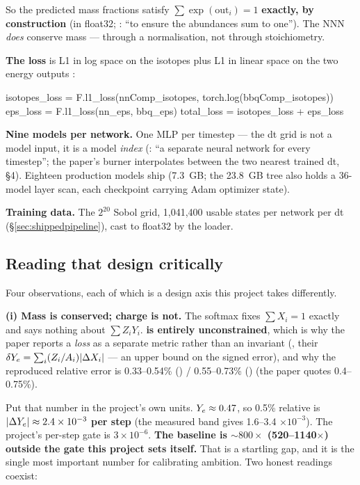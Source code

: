 So the predicted mass fractions satisfy $\sum\exp(\mathrm{out}_i) = 1$
\textbf{exactly, by construction} (in float32; \citealt[\S 2.3]{grichener2025}:
``to ensure the abundances sum to one''). The NNN \emph{does} conserve mass ---
through a normalisation, not through stoichiometry.

\textbf{The loss} is L1 in log space on the isotopes plus L1 in linear space on
the two energy outputs \citep[\S 2.4]{grichener2025}:

\begin{srclisting}
isotopes_loss = F.l1_loss(nnComp_isotopes, torch.log(bbqComp_isotopes))
eps_loss      = F.l1_loss(nn_eps, bbq_eps)
total_loss    = isotopes_loss + eps_loss
\end{srclisting}

\textbf{Nine models per network.} One MLP per timestep --- the dt grid is not a
model input, it is a model \emph{index} (\citealt[\S 2.2]{grichener2025}: ``a
separate neural network for every timestep''; the paper's burner interpolates
between the two nearest trained dt, \S 4). Eighteen production models ship
(7.3~GB; the 23.8~GB  tree also holds a 36-model
layer scan, each checkpoint carrying Adam optimizer state).

\textbf{Training data.} The $2^{20}$ Sobol grid, 1,041,400 usable states per
network per dt (\S\ref{sec:shippedpipeline}), cast to float32 by the loader.

\subsection{Reading that design critically}
\label{sec:nnncritical}

Four observations, each of which is a design axis this project takes
differently.

\textbf{(i) Mass is conserved; charge is not.} The softmax fixes
$\sum X_i = 1$ exactly and says nothing about $\sum Z_i Y_i$. \textbf{\Ye{} is
entirely unconstrained}, which is why the paper reports a \Ye{} \emph{loss} as
a separate metric rather than an invariant (\citealt[\S 3]{grichener2025},
their $\delta Y_{e} = \sum_i (Z_i/A_i)|\Delta X_i|$ --- an upper bound on the
signed error), and why the reproduced relative \Ye{} error is 0.33--0.54\%
() / 0.55--0.73\% ()  (the paper
quotes 0.4--0.75\%).

Put that number in the project's own units. $Y_{e} \approx 0.47$, so 0.5\%
relative is \textbf{$|\Delta Y_{e}| \approx 2.4 \times 10^{-3}$ per step} (the measured
band gives 1.6--3.4 $\times 10^{-3}$). The project's per-step gate is
$3 \times 10^{-6}$. \textbf{The baseline is ${\sim}800\times$
(520--1140$\times$) outside the gate this project sets itself.} That is a
startling gap, and it is the single most important number for calibrating
ambition. Two honest readings coexist:

